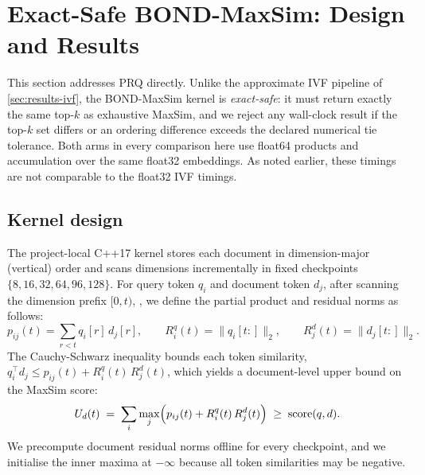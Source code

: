 \section{Exact-Safe BOND-MaxSim: Design and Results}
\label{sec:results-bond}

This section addresses PRQ directly. Unlike the approximate IVF pipeline of
\cref{sec:results-ivf}, the BOND-MaxSim kernel is \emph{exact-safe}: it must 
return exactly the same top-$k$ as exhaustive MaxSim, and we reject any 
wall-clock result if the top-$k$ set differs or an ordering difference exceeds 
the declared numerical tie tolerance. Both arms in every comparison here use 
float64 products and accumulation over the same float32 embeddings. As noted 
earlier, these timings are not comparable to the float32 IVF timings.

\subsection{Kernel design}
\label{sec:bond-design}

The project-local C++17 kernel stores each document in dimension-major
(vertical) order and scans dimensions incrementally in fixed checkpoints
$\{8, 16, 32, 64, 96, 128\}$. For query token $q_i$ and document token $d_j$,
after scanning the dimension prefix $[0, t)$, , we define the partial 
product and residual norms as follows:
\begin{equation}
  p_{ij}(t) = \sum_{r < t} q_i[r]\, d_j[r], \qquad
  R^{q}_{i}(t) = \bigl\lVert q_i[t{:}] \bigr\rVert_2, \qquad
  R^{d}_{j}(t) = \bigl\lVert d_j[t{:}] \bigr\rVert_2 .
\end{equation}
The Cauchy-Schwarz inequality bounds each token similarity,
$q_i^{\top} d_j \le p_{ij}(t) + R^{q}_{i}(t)\, R^{d}_{j}(t)$, which yields a
document-level upper bound on the MaxSim score:
\begin{equation}
  U_d(t) \;=\; \sum_{i} \max_{j}
    \Bigl( p_{ij}(t) + R^{q}_{i}(t)\, R^{d}_{j}(t) \Bigr)
  \;\ge\; \operatorname{score}(q, d).
  \label{eq:bond-bound}
\end{equation}
We precompute document residual norms offline for every checkpoint, and 
we initialise the inner maxima at $-\infty$ because all token similarities 
may be negative.

